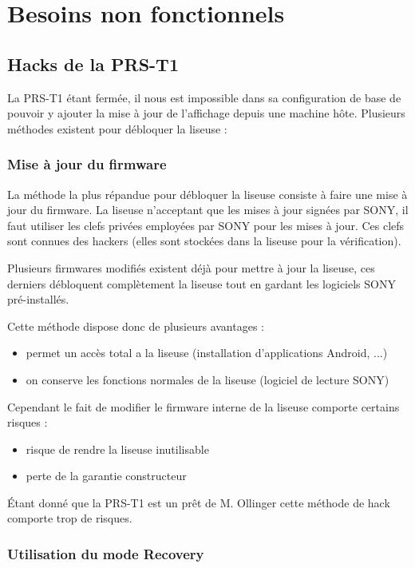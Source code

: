 \chapter{Besoins non fonctionnels}
\section{Hacks de la PRS-T1}

La PRS-T1 étant fermée, il nous est impossible dans sa configuration de base de pouvoir y ajouter la mise à jour 
de l'affichage depuis une machine hôte.
Plusieurs méthodes existent pour débloquer la liseuse : 

\subsection{Mise à jour du firmware}

La méthode la plus répandue pour débloquer la liseuse consiste à faire une mise à jour du firmware.
La liseuse n'acceptant que les mises à jour signées par SONY, il faut utiliser les clefs privées employées par SONY pour les mises à jour. Ces clefs sont connues des hackers (elles sont stockées dans la liseuse pour la vérification).

Plusieurs firmwares modifiés existent déjà pour mettre à jour la liseuse, ces derniers débloquent complètement la liseuse tout en gardant les logiciels SONY pré-installés.

Cette méthode dispose donc de plusieurs avantages : 
	\begin{itemize}
		\item permet un accès total a la liseuse (installation d'applications Android, ...)
		\item on conserve les fonctions normales de la liseuse (logiciel de lecture SONY)
	\end{itemize}
Cependant le fait de modifier le firmware interne de la liseuse comporte certains risques : 
	\begin{itemize}
		\item risque de rendre la liseuse inutilisable
		\item perte de la garantie constructeur
	\end{itemize}

Étant donné que la PRS-T1 est un prêt de M. Ollinger cette méthode de hack comporte trop de risques.

\subsection{Utilisation du mode Recovery}

